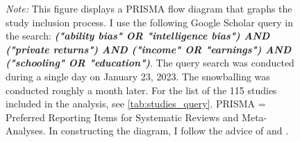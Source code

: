 \begin{figure}[!htbp]
\begin{tikzpicture}[
    node distance=0.9cm,
    start chain=1 going below,
    every join/.style=arrow,
    ]
\end{tikzpicture}
\vspace{0.1cm}
\captionsetup{width=0.9\textwidth, font = scriptsize}
\caption*{\emph{Note:} This figure displays a PRISMA flow diagram that graphs the study inclusion process. I use the following Google Scholar query in the search: \textit{\textbf{("ability bias" OR "intelligence bias") AND ("private returns") AND ("income" OR "earnings") AND ("schooling" OR "education")}}. The query search was conducted during a single day on January 23, 2023. The snowballing was conducted roughly a month later. For the list of the 115 studies included in the analysis, see \autoref{tab:studies_query}. PRISMA = Preferred Reporting Items for Systematic Reviews and Meta-Analyses. In constructing the diagram, I follow the advice of \cite{moher2009preferred} and \cite{havranek2020guidelines}.}
\end{figure}



